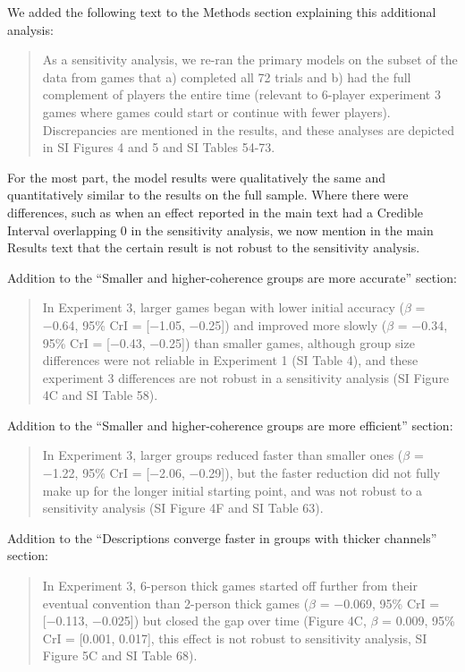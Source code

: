 \documentclass{stanfordletter}
\newcommand{\revised}[1]{\begin{quote}	#1 \end{quote}}
\begin{document}
\begin{letter}{}
          We added the following text to the Methods section explaining this additional analysis:
          

          \revised{As a sensitivity analysis, we re-ran the primary models on the subset of the data from games that a) completed all 72 trials and b) had the full complement of players the entire time (relevant to 6-player experiment 3 games where games could start or continue with fewer players). Discrepancies are mentioned in the results, and these analyses are depicted in SI Figures 4 and 5 and SI Tables 54-73. }
          
          For the most part, the model results were qualitatively the same and quantitatively similar to the results on the full sample. Where there were differences, such as when an effect reported in the main text had a Credible Interval overlapping 0 in the sensitivity analysis, we now mention in the main Results text that the certain result is not robust to the sensitivity analysis. 


          Addition to the ``Smaller and higher-coherence groups are more accurate'' section: 
          \revised{In Experiment 3, larger games began with
          	lower initial accuracy ($\beta$ = −0.64, 95\% CrI = [−1.05, −0.25]) and improved more slowly ($\beta$ =
          	−0.34, 95\% CrI = [−0.43, −0.25]) than smaller games, although group size differences were not
          	reliable in Experiment 1 (SI Table 4), and these experiment 3 differences are not robust in a 
          	sensitivity	analysis (SI	Figure 4C and SI Table 58).}
          
          
          Addition to the ``Smaller and higher-coherence groups are more efficient'' section: 
          \revised{In
          	Experiment 3, larger groups reduced faster than smaller ones ($\beta$ = −1.22, 95\% CrI = [−2.06, −0.29]),
          	but the faster reduction did not fully make up for the longer initial starting point, and was not robust to a sensitivity analysis (SI Figure 4F and SI Table
          	63).}
          	
          	Addition to the ``Descriptions converge faster in groups with thicker channels'' section: 
          	\revised{In Experiment 3, 6-person thick games started off further
          		from their eventual convention than 2-person thick games ($\beta$ = −0.069, 95\% CrI = [−0.113, −0.025])
          		but closed the gap over time (Figure 4C, $\beta$ = 0.009, 95\% CrI = [0.001, 0.017], this effect is not robust to sensitivity analysis,
          		SI Figure 5C and SI Table 68).}
          	

\end{letter}
\end{document}
